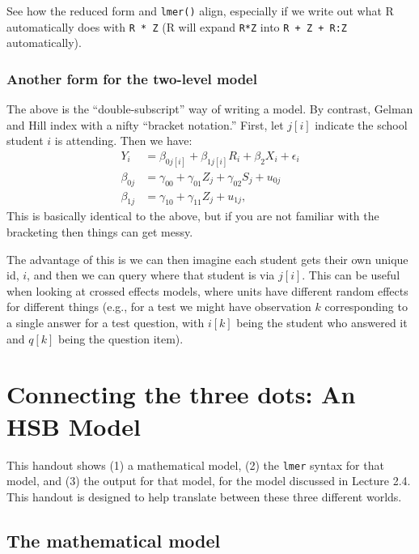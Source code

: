 \documentclass[
  letterpaper,
  DIV=11,
  numbers=noendperiod]{scrreprt}
\begin{document}
See how the reduced form and \texttt{lmer()} align, especially if we
write out what R automatically does with \texttt{R\ *\ Z} (R will expand
\texttt{R*Z} into \texttt{R\ +\ Z\ +\ R:Z} automatically).

\hypertarget{another-form-for-the-two-level-model}{%
\subsection{Another form for the two-level
model}\label{another-form-for-the-two-level-model}}

The above is the ``double-subscript'' way of writing a model. By
contrast, Gelman and Hill index with a nifty ``bracket notation.''
First, let \(j[i]\) indicate the school student \(i\) is attending. Then
we have: \[\begin{aligned}
Y_{i} &= \beta_{0j[i]} + \beta_{1j[i]} R_{i} + \beta_{2} X_{i} + \epsilon_{i} \\
\beta_{0j} &= \gamma_{00} + \gamma_{01} Z_{j} + \gamma_{02} S_{j} + u_{0j} \\
\beta_{1j} &= \gamma_{10} + \gamma_{11} Z_{j} + u_{1j},
\end{aligned}\] This is basically identical to the above, but if you are
not familiar with the bracketing then things can get messy.

The advantage of this is we can then imagine each student gets their own
unique id, \(i\), and then we can query where that student is via
\(j[i]\). This can be useful when looking at crossed effects models,
where units have different random effects for different things (e.g.,
for a test we might have observation \(k\) corresponding to a single
answer for a test question, with \(i[k]\) being the student who answered
it and \(q[k]\) being the question item).

\hypertarget{connecting-the-three-dots-an-hsb-model}{%
\chapter{Connecting the three dots: An HSB
Model}\label{connecting-the-three-dots-an-hsb-model}}

This handout shows (1) a mathematical model, (2) the \texttt{lmer}
syntax for that model, and (3) the output for that model, for the model
discussed in Lecture 2.4. This handout is designed to help translate
between these three different worlds.

\hypertarget{the-mathematical-model}{%
\section{The mathematical model}\label{the-mathematical-model}}
\end{document}

